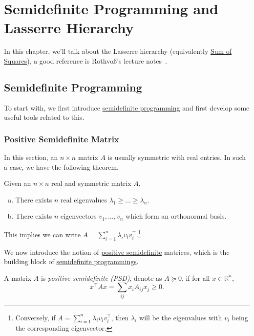 \chapter{Semidefinite Programming and Lasserre Hierarchy}
In this chapter, we'll talk about the Lasserre hierarchy (equivalently \href{https://en.wikipedia.org/wiki/Sum-of-squares_optimization}{Sum of Squares}), a good reference is Rothvoß's lecture notes~\cite{LasserreHierarchy}.

\section{Semidefinite Programming}
To start with, we first introduce \hyperref[def:SDP]{semidefinite programming} and first develop some useful tools related to this.
\subsection{Positive Semidefinite Matrix}
In this section, an \(n\times n\) matrix \(A\) is usually symmetric with real entries. In such a case, we have the following theorem.

\begin{prev}
	Given an \(n\times n\) real and symmetric matrix \(A\),
	\begin{enumerate}[(a)]
		\item There exists \(n\) real eigenvalues \(\lambda _1 \geq \dots \geq \lambda _n \).
		\item There exists \(n\) eigenvectors \(v_1, \dots  , v_n\) which form an orthonormal basis.
	\end{enumerate}
	This implies we can write \(A = \sum_{i=1}^n \lambda _i v_i v_i ^{\top}\).\footnote{Conversely, if \(A= \sum_{i=1}^n \lambda _i v_i v_i ^{\top}  \), then \(\lambda _i\) will be the eigenvalues with \(v_i\) being the corresponding eigenvector.}
\end{prev}

We now introduce the notion of \hyperref[def:PSD]{positive semidefinite} matrices, which is the building block of \hyperref[def:SDP]{semidefinite programmings}.

\begin{definition}\label{def:PSD}
	A matrix \(A\) is \emph{positive semidefinite (PSD)}, denote as \(A \succeq 0\), if for all \(x\in \mathbb{R} ^n\),
	\[
		x^{\top} A x = \sum_{ij} x_i A_{ij} x_j \geq 0.
	\]
\end{definition}

